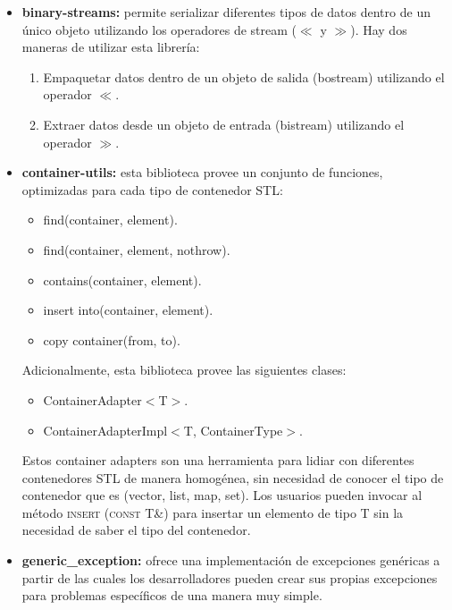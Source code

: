 \documentclass[12pt,a4paper,spanish]{article}
\begin{document}
		\begin{itemize}
			\item \textbf{binary-streams:} permite serializar diferentes tipos de datos dentro de un único objeto 				utilizando los operadores de stream ($\ll$ y $\gg$). Hay dos maneras de utilizar esta librería:
			\begin{enumerate}
				\item Empaquetar datos dentro de un objeto de salida (bostream) utilizando el operador $\ll$.	
				\item Extraer datos desde un objeto de entrada (bistream) utilizando el operador $\gg$.
			\end{enumerate}
			\item \textbf{container-utils:} esta biblioteca provee un conjunto de funciones, optimizadas para cada tipo de 					contenedor STL:
				\begin{itemize}
					\item \textsf{find(container, element)}.
					\item \textsf{find(container, element, nothrow)}.
					\item \textsf{contains(container, element)}.
					\item \textsf{insert into(container, element)}.
					\item \textsf{copy container(from, to)}.
				\end{itemize}
		\par Adicionalmente, esta biblioteca provee las siguientes clases:
			\begin{itemize}
				\item \textsf{ContainerAdapter$<$T$>$}.
				\item \textsf{ContainerAdapterImpl$<$T, ContainerType$>$}.
			\end{itemize}
		\par Estos container adapters son una herramienta para lidiar con diferentes contenedores \textsc{STL} de manera 			homogénea, sin necesidad de conocer el tipo de contenedor que es (vector, list, map, set). Los usuarios pueden 			invocar al método \textsc{insert (const T\&)} para insertar un elemento de tipo \textsc{T} sin la necesidad de 			saber el tipo del contenedor.

		\item \textbf{generic\_exception:} ofrece una implementación de excepciones genéricas a partir de las cuales los 			desarrolladores pueden crear sus propias excepciones para problemas específicos de una manera muy simple.
	\end{itemize}
		
\end{document}
